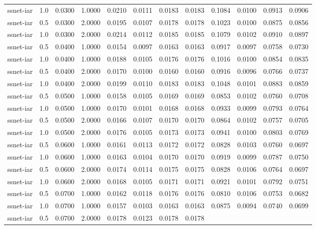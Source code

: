 \documentclass[
]{article}
\begin{document}
\begin{longtable}[]{@{}lrrrrrrrrrrr@{}}
ssnet-iar & 1.0 & 0.0300 & 1.0000 & 0.0210 & 0.0111 & 0.0183 & 0.0183 &
0.1084 & 0.0100 & 0.0913 & 0.0906 \\
ssnet-iar & 0.5 & 0.0300 & 2.0000 & 0.0195 & 0.0107 & 0.0178 & 0.0178 &
0.1023 & 0.0100 & 0.0875 & 0.0856 \\
ssnet-iar & 1.0 & 0.0300 & 2.0000 & 0.0214 & 0.0112 & 0.0185 & 0.0185 &
0.1079 & 0.0102 & 0.0910 & 0.0897 \\
ssnet-iar & 0.5 & 0.0400 & 1.0000 & 0.0154 & 0.0097 & 0.0163 & 0.0163 &
0.0917 & 0.0097 & 0.0758 & 0.0730 \\
ssnet-iar & 1.0 & 0.0400 & 1.0000 & 0.0188 & 0.0105 & 0.0176 & 0.0176 &
0.1016 & 0.0100 & 0.0854 & 0.0835 \\
ssnet-iar & 0.5 & 0.0400 & 2.0000 & 0.0170 & 0.0100 & 0.0160 & 0.0160 &
0.0916 & 0.0096 & 0.0766 & 0.0737 \\
ssnet-iar & 1.0 & 0.0400 & 2.0000 & 0.0199 & 0.0110 & 0.0183 & 0.0183 &
0.1048 & 0.0101 & 0.0883 & 0.0859 \\
ssnet-iar & 0.5 & 0.0500 & 1.0000 & 0.0158 & 0.0105 & 0.0169 & 0.0169 &
0.0853 & 0.0102 & 0.0760 & 0.0708 \\
ssnet-iar & 1.0 & 0.0500 & 1.0000 & 0.0170 & 0.0101 & 0.0168 & 0.0168 &
0.0933 & 0.0099 & 0.0793 & 0.0764 \\
ssnet-iar & 0.5 & 0.0500 & 2.0000 & 0.0166 & 0.0107 & 0.0170 & 0.0170 &
0.0864 & 0.0102 & 0.0757 & 0.0705 \\
ssnet-iar & 1.0 & 0.0500 & 2.0000 & 0.0176 & 0.0105 & 0.0173 & 0.0173 &
0.0941 & 0.0100 & 0.0803 & 0.0769 \\
ssnet-iar & 0.5 & 0.0600 & 1.0000 & 0.0161 & 0.0113 & 0.0172 & 0.0172 &
0.0828 & 0.0103 & 0.0760 & 0.0697 \\
ssnet-iar & 1.0 & 0.0600 & 1.0000 & 0.0163 & 0.0104 & 0.0170 & 0.0170 &
0.0919 & 0.0099 & 0.0787 & 0.0750 \\
ssnet-iar & 0.5 & 0.0600 & 2.0000 & 0.0174 & 0.0114 & 0.0175 & 0.0175 &
0.0828 & 0.0106 & 0.0764 & 0.0697 \\
ssnet-iar & 1.0 & 0.0600 & 2.0000 & 0.0168 & 0.0105 & 0.0171 & 0.0171 &
0.0921 & 0.0101 & 0.0792 & 0.0751 \\
ssnet-iar & 0.5 & 0.0700 & 1.0000 & 0.0162 & 0.0118 & 0.0176 & 0.0176 &
0.0810 & 0.0106 & 0.0753 & 0.0682 \\
ssnet-iar & 1.0 & 0.0700 & 1.0000 & 0.0157 & 0.0103 & 0.0163 & 0.0163 &
0.0875 & 0.0094 & 0.0740 & 0.0699 \\
ssnet-iar & 0.5 & 0.0700 & 2.0000 & 0.0178 & 0.0123 & 0.0178 & 0.0178 &

\end{longtable}
\end{document}
